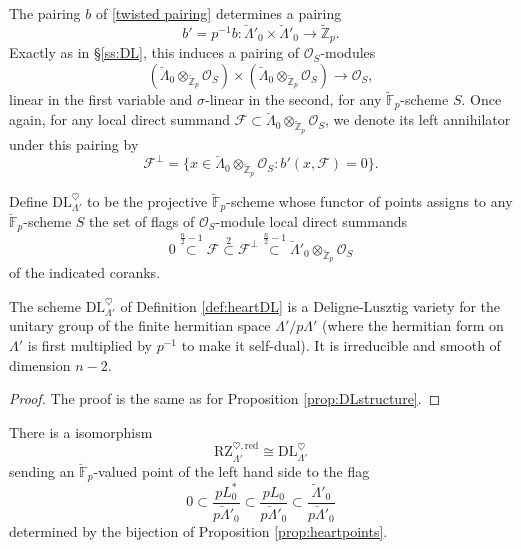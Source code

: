 \documentclass[11pt]{alggeom}
\newcommand{\iso}{\cong}
\newcommand{\red}{\mathrm{red}}
\newcommand{\Z}{\mathbb Z}
\newcommand{\F}{\mathbb F}
\newcommand{\co}{\mathcal O}
\begin{document}
 
 The pairing $b$ of \eqref{twisted pairing} determines a pairing 
\[
b' =p^{-1}b   : \breve{\Lambda}'_0  \times \breve{\Lambda}'_0 \to \breve{\Z}_p.
\]
Exactly as in \S \ref{ss:DL}, this induces a pairing of $\co_S$-modules
\[
 ( \breve{\Lambda}_0 \otimes_{ \breve{\Z}_p} \co_S ) \times ( \breve{\Lambda}_0 \otimes_{ \breve{\Z}_p}  \co_S )
  \to \co_S, 
\]
 linear in the first variable and $\sigma$-linear in the second, for any $\breve{\F}_p$-scheme $S$.
 Once again, for any local direct summand $\mathscr{F} \subset  \breve{\Lambda}_0 \otimes_{ \breve{\Z}_p}  \co_S$, we denote   its left annihilator under this pairing by
\[
\mathscr{F}^\perp = \{ x \in  \breve{\Lambda}_0 \otimes_{ \breve{\Z}_p}   \co_S :  b'( x, \mathscr{F} ) =0 \}.
\]


 



\begin{definition}\label{def:heartDL}
Define $\mathrm{DL}_{\Lambda'}^\heartsuit$ to be the projective $\breve{\F}_p$-scheme whose functor of points assigns to any $\breve{\F}_p$-scheme $S$ the set of flags of $\co_S$-module local direct summands
\[
0 \stackrel{\frac{n}{2}-1} { \subset }  \mathscr{F} 
\stackrel{ 2}{\subset} \mathscr{F}^\perp \stackrel{\frac{n}{2}-1} { \subset }
 \breve{\Lambda}'_0 \otimes_{\breve{\Z}_p} \co_S
\]
of the indicated coranks.   
\end{definition}




\begin{proposition}
The scheme $\mathrm{DL}_{\Lambda'}^\heartsuit$  of Definition \ref{def:heartDL} is a Deligne-Lusztig variety for the unitary group of the finite hermitian space $\Lambda'/p\Lambda'$ (where the hermitian form on $\Lambda'$ is first multiplied by $p^{-1}$ to make it self-dual).
It is irreducible and smooth of dimension $n-2$.
\end{proposition}



\begin{proof}
The proof is the same as for Proposition \ref{prop:DLstructure}.
\end{proof}





\begin{theorem}\label{thm:heart comparison}
There is a isomorphism  
\[
\mathrm{RZ}_{\Lambda'}^{\heartsuit,\red} \iso \mathrm{DL}_{\Lambda'}^\heartsuit 
\]
sending an $\breve{\F}_p$-valued point of the left hand side  to the flag
\[
0 \subset  \frac{pL_0^*}{p\breve{\Lambda}'_0} 
\subset \frac{pL_0}{p\breve{\Lambda}'_0}  \subset
  \frac{ \breve{\Lambda}'_0 }{ p\breve{\Lambda}'_0 } 
\]
determined by the bijection of  Proposition \ref{prop:heartpoints}.
\end{theorem}
\end{document}
